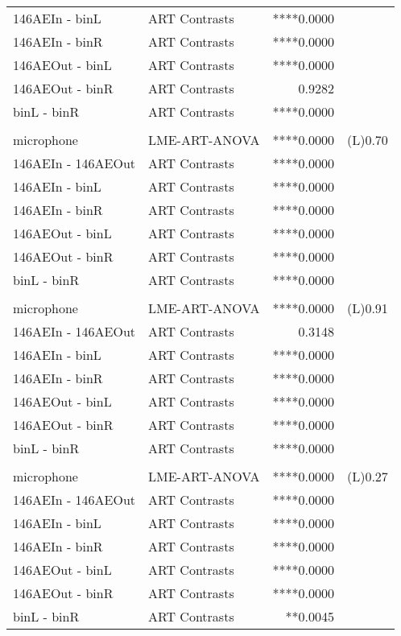 \begin{table}
\begin{tabular*}{\linewidth}{@{\extracolsep{\fill}}llrl}
146AEIn - binL & ART Contrasts & ****0.0000 &  \\ 
146AEIn - binR & ART Contrasts & ****0.0000 &  \\ 
146AEOut - binL & ART Contrasts & ****0.0000 &  \\ 
146AEOut - binR & ART Contrasts &  0.9282 &  \\ 
binL - binR & ART Contrasts & ****0.0000 &  \\ 
\midrule\addlinespace[2.5pt]
\multicolumn{4}{l}{LCSmax} \\[2.5pt] 
\midrule\addlinespace[2.5pt]
microphone & LME-ART-ANOVA & ****0.0000 & (L)0.70 \\ 
146AEIn - 146AEOut & ART Contrasts & ****0.0000 &  \\ 
146AEIn - binL & ART Contrasts & ****0.0000 &  \\ 
146AEIn - binR & ART Contrasts & ****0.0000 &  \\ 
146AEOut - binL & ART Contrasts & ****0.0000 &  \\ 
146AEOut - binR & ART Contrasts & ****0.0000 &  \\ 
binL - binR & ART Contrasts & ****0.0000 &  \\ 
\midrule\addlinespace[2.5pt]
\multicolumn{4}{l}{LCS-LAS} \\[2.5pt] 
\midrule\addlinespace[2.5pt]
microphone & LME-ART-ANOVA & ****0.0000 & (L)0.91 \\ 
146AEIn - 146AEOut & ART Contrasts &  0.3148 &  \\ 
146AEIn - binL & ART Contrasts & ****0.0000 &  \\ 
146AEIn - binR & ART Contrasts & ****0.0000 &  \\ 
146AEOut - binL & ART Contrasts & ****0.0000 &  \\ 
146AEOut - binR & ART Contrasts & ****0.0000 &  \\ 
binL - binR & ART Contrasts & ****0.0000 &  \\ 
\midrule\addlinespace[2.5pt]
\multicolumn{4}{l}{LAS10-LAS90} \\[2.5pt] 
\midrule\addlinespace[2.5pt]
microphone & LME-ART-ANOVA & ****0.0000 & (L)0.27 \\ 
146AEIn - 146AEOut & ART Contrasts & ****0.0000 &  \\ 
146AEIn - binL & ART Contrasts & ****0.0000 &  \\ 
146AEIn - binR & ART Contrasts & ****0.0000 &  \\ 
146AEOut - binL & ART Contrasts & ****0.0000 &  \\ 
146AEOut - binR & ART Contrasts & ****0.0000 &  \\ 
binL - binR & ART Contrasts & **0.0045 &  \\ 
\bottomrule
\end{tabular*}
\end{table}

